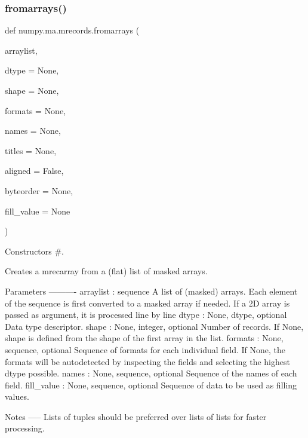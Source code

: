 \subsubsection{\texorpdfstring{fromarrays()}{fromarrays()}}
{\footnotesize\ttfamily def numpy.\+ma.\+mrecords.\+fromarrays (\begin{DoxyParamCaption}\item[{}]{arraylist,  }\item[{}]{dtype = {\ttfamily None},  }\item[{}]{shape = {\ttfamily None},  }\item[{}]{formats = {\ttfamily None},  }\item[{}]{names = {\ttfamily None},  }\item[{}]{titles = {\ttfamily None},  }\item[{}]{aligned = {\ttfamily False},  }\item[{}]{byteorder = {\ttfamily None},  }\item[{}]{fill\+\_\+value = {\ttfamily None} }\end{DoxyParamCaption})}



Constructors \#. 

\begin{DoxyVerb}Creates a mrecarray from a (flat) list of masked arrays.

Parameters
----------
arraylist : sequence
    A list of (masked) arrays. Each element of the sequence is first converted
    to a masked array if needed. If a 2D array is passed as argument, it is
    processed line by line
dtype : {None, dtype}, optional
    Data type descriptor.
shape : {None, integer}, optional
    Number of records. If None, shape is defined from the shape of the
    first array in the list.
formats : {None, sequence}, optional
    Sequence of formats for each individual field. If None, the formats will
    be autodetected by inspecting the fields and selecting the highest dtype
    possible.
names : {None, sequence}, optional
    Sequence of the names of each field.
fill_value : {None, sequence}, optional
    Sequence of data to be used as filling values.

Notes
-----
Lists of tuples should be preferred over lists of lists for faster processing.\end{DoxyVerb}
 \mbox{\label{namespacenumpy_1_1ma_1_1mrecords_a359f017d2aa568063b7f9c6adf5f4d68}} 
